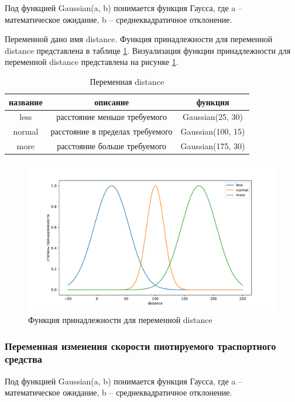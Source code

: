 \documentclass[12pt]{report}
\begin{document}
Под функцией Gaussian(a, b) понимается функция Гаусса, где a -- математическое ожидание, b -- среднеквадратичное отклонение.

Переменной дано имя distance.
Функция принадлежности для переменной distance представлена в таблице \ref{table:distance}. 
Визуализация функции принадлежности для переменной distance представлена на рисунке \ref{fig:var_dist}.
\newpage

\begin{table} [h!]
	\caption{Переменная distance} 
 \label{table:distance}
	\begin{center}
	\begin{tabular}{|c c c|}
\hline название  & описание  & функция \\
\hline less & расстояние меньше требуемого & Gaussian(25, 30) \\
\hline normal & расстояние в пределах требуемого & Gaussian(100, 15) \\
\hline more & расстояние больше требуемого & Gaussian(175, 30) \\
\hline
	\end{tabular}
	\end{center}
\end{table}


\begin{figure}[h!]
  \centering
  \includegraphics[width = \linewidth]{variable_distance.pdf}
  \caption{Функция принадлежности для переменной distance}
  \label{fig:var_dist}
\end{figure}

\subsubsection{Переменная изменения скорости пиотируемого траспортного средства}
Под функцией Gaussian(a, b) понимается функция Гаусса, где a -- математическое ожидание, b -- среднеквадратичное отклонение.
\end{document}
